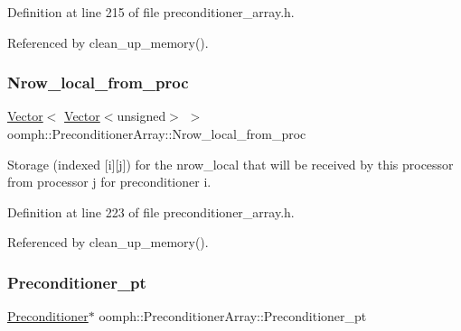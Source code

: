 Definition at line 215 of file preconditioner\+\_\+array.\+h.



Referenced by clean\+\_\+up\+\_\+memory().

\mbox{\label{classoomph_1_1PreconditionerArray_aa48322538496f9f1b6d2d89666972ac4}} 
\subsubsection{\texorpdfstring{Nrow\+\_\+local\+\_\+from\+\_\+proc}{Nrow\_local\_from\_proc}}
{\footnotesize\ttfamily \hyperlink{classoomph_1_1Vector}{Vector}$<$ \hyperlink{classoomph_1_1Vector}{Vector}$<$unsigned$>$ $>$ oomph\+::\+Preconditioner\+Array\+::\+Nrow\+\_\+local\+\_\+from\+\_\+proc\hspace{0.3cm}{\ttfamily [private]}}



Storage (indexed \mbox{[}i\mbox{]}\mbox{[}j\mbox{]}) for the nrow\+\_\+local that will be received by this processor from processor j for preconditioner i. 



Definition at line 223 of file preconditioner\+\_\+array.\+h.



Referenced by clean\+\_\+up\+\_\+memory().

\mbox{\label{classoomph_1_1PreconditionerArray_a963dad278f4abf1195666a4a050a0390}} 
\subsubsection{\texorpdfstring{Preconditioner\+\_\+pt}{Preconditioner\_pt}}
{\footnotesize\ttfamily \hyperlink{classoomph_1_1Preconditioner}{Preconditioner}$\ast$ oomph\+::\+Preconditioner\+Array\+::\+Preconditioner\+\_\+pt\hspace{0.3cm}{\ttfamily [private]}}



